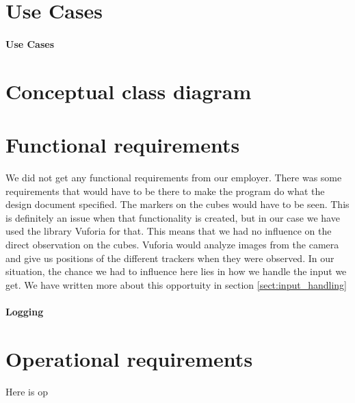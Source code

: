 \section{Use Cases}

\paragraph{Use Cases}

\section{Conceptual class diagram}

\section{Functional requirements}
We did not get any functional requirements from our employer. There was
some requirements that would have to be there to make the program do what the
design document specified. The markers on the cubes would have to be seen. This
is definitely an issue when that functionality is created, but in our case we
have used the library \gls{Vuforia} for that. This means that we had no
influence on the direct observation on the cubes. Vuforia would analyze images
from the camera and give us positions of the different trackers when they were
observed. In our situation, the chance we had to influence here lies in how we
handle the input we get. We have written more about this opportuity in section
\ref{sect:input_handling}

\paragraph{Logging}

\section{Operational requirements}
Here is op